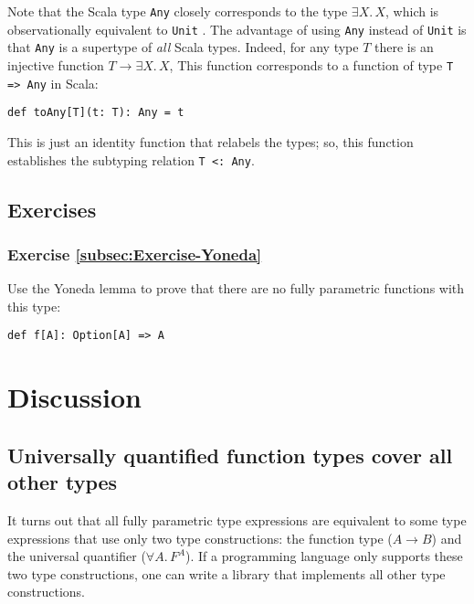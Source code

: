 Note that the Scala type \lstinline!Any!
closely corresponds to the type $\exists X.\,X$, which is observationally
equivalent to \lstinline!Unit!
. The advantage of using \lstinline!Any!
instead of \lstinline!Unit!
is that \lstinline!Any!
is a supertype of \emph{all} Scala types. Indeed, for any type $T$
there is an injective function $T\rightarrow\exists X.\,X$, This
function corresponds to a function of type \lstinline!T => Any!
in Scala:
\begin{lstlisting}
def toAny[T](t: T): Any = t
\end{lstlisting}
 This is just an identity function that relabels the types; so, this
function establishes the subtyping relation \lstinline!T <: Any!.

\subsection{Exercises}

\subsubsection{Exercise \label{subsec:Exercise-Yoneda}\ref{subsec:Exercise-Yoneda}}

Use the Yoneda lemma to prove that there are no fully parametric functions
with this type:

\begin{lstlisting}
def f[A]: Option[A] => A
\end{lstlisting}

\section{Discussion}

\subsection{Universally quantified function types cover all other types}

It turns out that all fully parametric type expressions are equivalent
to some type expressions that use only two type constructions: the
function type ($A\rightarrow B$) and the universal quantifier ($\forall A.\,F^{A}$).
If a programming language only supports these two type constructions,
one can write a library that implements all other type constructions.

